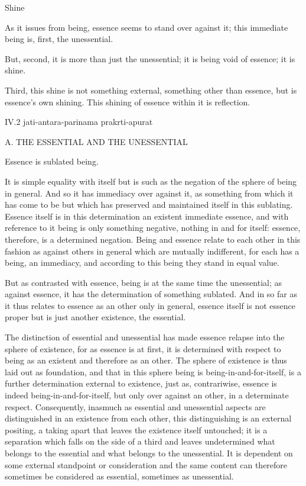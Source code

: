 Shine

As it issues from being, essence seems to stand over against it;
this immediate being is, first, the unessential.

But, second, it is more than just the unessential;
it is being void of essence; it is shine.

Third, this shine is not something external,
something other than essence, but is essence's own shining.
This shining of essence within it is reflection.

IV.2
jati-antara-parinama prakrti-apurat

A. THE ESSENTIAL AND THE UNESSENTIAL

Essence is sublated being.

It is simple equality with itself
but is such as the negation of
the sphere of being in general.
And so it has immediacy over against it,
as something from which it has come to be but which has
preserved and maintained itself in this sublating.
Essence itself is in this determination
an existent immediate essence,
and with reference to it
being is only something negative,
nothing in and for itself:
essence, therefore, is a determined negation.
Being and essence relate to each other in this fashion
as against others in general which are mutually indifferent,
for each has a being, an immediacy,
and according to this being they stand in equal value.

But as contrasted with essence,
being is at the same time the unessential;
as against essence, it has the determination of something sublated.
And in so far as it thus relates to essence
as an other only in general,
essence itself is not essence proper
but is just another existence, the essential.

The distinction of essential and unessential has
made essence relapse into the sphere of existence,
for as essence is at first,
it is determined with respect to being
as an existent and therefore as an other.
The sphere of existence is thus laid out as foundation,
and that in this sphere being is being-in-and-for-itself,
is a further determination external to existence,
just as, contrariwise, essence is indeed being-in-and-for-itself,
but only over against an other, in a determinate respect.
Consequently, inasmuch as essential and unessential aspects are
distinguished in an existence from each other,
this distinguishing is an external positing,
a taking apart that leaves the existence itself untouched;
it is a separation which falls on the side of
a third and leaves undetermined
what belongs to the essential
and what belongs to the unessential.
It is dependent on some external standpoint or consideration
and the same content can therefore sometimes be considered
as essential, sometimes as unessential.

